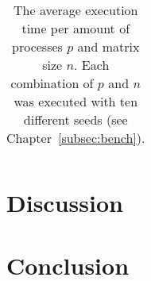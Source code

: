 \documentclass[twoside,11pt]{article}
\begin{document}
\begin{table}
  \begin{center}
  \begin{tabu} to \textwidth {l|rrrr}
    
  \end{tabu}
  \end{center}
  \caption{The average execution time per amount of
    processes $p$ and matrix size $n$. Each combination
    of $p$ and $n$ was executed with ten different seeds
    (see Chapter~\ref{subsec:bench}).}
  \label{tab:t}
\end{table}



\section{Discussion} %


\section{Conclusion} %



\end{document}
